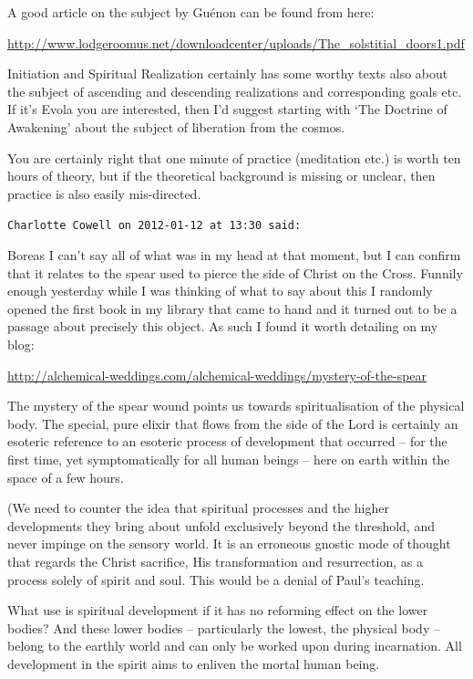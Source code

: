 \begin{footnotesize}
\begin{sffamily}
A good article on the subject by Guénon can be found from here:

\url{http://www.lodgeroomus.net/downloadcenter/uploads/The\_solstitial\_doors1.pdf}

Initiation and Spiritual Realization certainly has some worthy texts also about the subject of ascending and descending realizations and corresponding goals etc. If it's Evola you are interested, then I'd suggest starting with `The Doctrine of Awakening' about the subject of liberation from the cosmos.

You are certainly right that one minute of practice (meditation etc.) is worth ten hours of theory, but if the theoretical background is missing or unclear, then practice is also easily mis-directed.


\hfill

\texttt{Charlotte Cowell on 2012-01-12 at 13:30 said: }

Boreas I can't say all of what was in my head at that moment, but I can confirm that it relates to the spear used to pierce the side of Christ on the Cross. Funnily enough yesterday while I was thinking of what to say about this I randomly opened the first book in my library that came to hand and it turned out to be a passage about precisely this object. As such I found it worth detailing on my blog:

\url{http://alchemical-weddings.com/alchemical-weddings/mystery-of-the-spear}

The mystery of the spear wound points us towards spiritualisation of the physical body. The special, pure elixir that flows from the side of the Lord is certainly an esoteric reference to an esoteric process of development that occurred – for the first time, yet symptomatically for all human beings – here on earth within the space of a few hours.

(We need to counter the idea that spiritual processes and the higher developments they bring about unfold exclusively beyond the threshold, and never impinge on the sensory world. It is an erroneous gnostic mode of thought that regards the Christ sacrifice, His transformation and resurrection, as a process solely of spirit and soul. This would be a denial of Paul's teaching.

What use is spiritual development if it has no reforming effect on the lower bodies? And these lower bodies – particularly the lowest, the physical body – belong to the earthly world and can only be worked upon during incarnation. All development in the spirit aims to enliven the mortal human being.


\end{sffamily}
\end{footnotesize}
